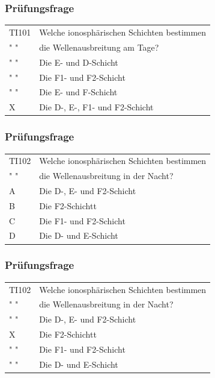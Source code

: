 \begin{frame}
    \frametitle{Prüfungsfrage}

    \begin{center}
    \begin{tabular}{l||l}\hline
        TI101 & Welche ionosphärischen Schichten bestimmen \\
         " "  & die Wellenausbreitung am Tage? \\\hline\hline
         " " 	  & Die E- und D-Schicht \\\hline
         " " 	  & Die F1- und F2-Schicht \\\hline
         " "	  & Die E- und F-Schicht \\\hline
         X 	  & Die D-, E-, F1- und F2-Schicht\\\hline
    \end{tabular}
 	\end{center}
\end{frame}

\begin{frame}
    \frametitle{Prüfungsfrage}

    \begin{center}
    \begin{tabular}{l||l}\hline
        TI102 & Welche ionosphärischen Schichten bestimmen \\
         " "  & die Wellenausbreitung in der Nacht? \\\hline\hline
         A 	  & Die D-, E- und F2-Schicht \\\hline
         B 	  & Die F2-Schichtt \\\hline
         C	  & Die F1- und F2-Schicht \\\hline
         D 	  & Die D- und E-Schicht\\\hline
    \end{tabular}
 	\end{center}
\end{frame}

\begin{frame}
    \frametitle{Prüfungsfrage}

    \begin{center}
    \begin{tabular}{l||l}\hline
        TI102 & Welche ionosphärischen Schichten bestimmen \\
         " "  & die Wellenausbreitung in der Nacht? \\\hline\hline
         " " 	  & Die D-, E- und F2-Schicht \\\hline
         X 	  & Die F2-Schichtt \\\hline
         " "	  & Die F1- und F2-Schicht \\\hline
         " " 	  & Die D- und E-Schicht\\\hline
    \end{tabular}
 	\end{center}
\end{frame}


